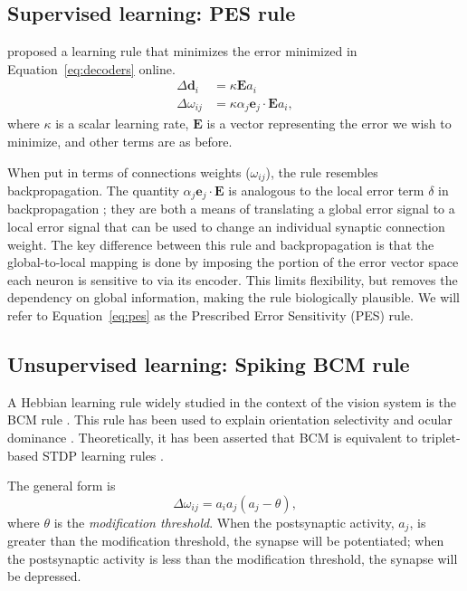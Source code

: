 \documentclass[10pt,letterpaper]{article}
\begin{document}
\subsection{Supervised learning: PES rule}

 proposed a learning rule
that minimizes the error minimized
in Equation~\eqref{eq:decoders} online.
\begin{align} \label{eq:pes}
  \Delta \mathbf{d}_i &= \kappa \mathbf{E} a_i \nonumber \\
  \Delta \omega_{ij} &= \kappa \alpha_j \mathbf{e}_j \cdot \mathbf{E} a_i,
\end{align}
where $\kappa$ is a scalar learning rate,
$\mathbf{E}$ is a vector representing the error we wish to minimize,
and other terms are as before.

When put in terms of connections weights ($\omega_{ij}$),
the rule resembles backpropagation.
The quantity $\alpha_j \mathbf{e}_j \cdot \mathbf{E}$
is analogous to the local error term
$\delta$ in backpropagation \cite{Rumelhart1986};
they are both a means of translating a global error signal
to a local error signal that can be used to
change an individual synaptic connection weight.
The key difference between this rule
and backpropagation is that the global-to-local mapping
is done by imposing the portion of the error vector space
each neuron is sensitive to via its encoder.
This limits flexibility, but removes the dependency
on global information, making the rule biologically plausible.
We will refer to Equation~\eqref{eq:pes} as
the Prescribed Error Sensitivity (PES) rule.

\subsection{Unsupervised learning: Spiking BCM rule}

A Hebbian learning rule widely studied
in the context of the vision system
is the BCM rule \cite{Bienenstock1982}.
This rule has been used to explain orientation selectivity
and ocular dominance \cite{Bienenstock1982}.
Theoretically, it has been asserted that BCM is equivalent
to triplet-based STDP learning rules \cite{Pfister2006}.

The general form is
\begin{equation} \label{eq:orig-bcm}
  \Delta \omega_{ij} = a_i a_j (a_j - \theta),
\end{equation}
where $\theta$ is the \textit{modification threshold}.
When the postsynaptic activity, $a_j$, is
greater than the modification threshold,
the synapse will be potentiated;
when the postsynaptic activity is less than the modification threshold,
the synapse will be depressed.
\end{document}

